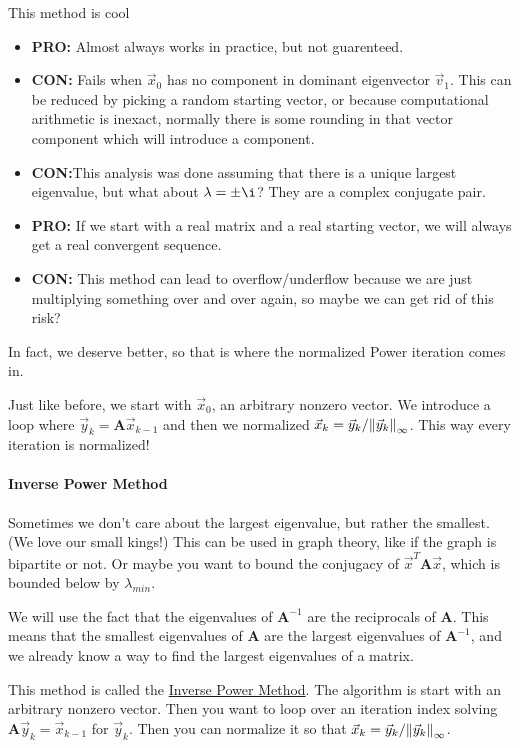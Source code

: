\documentclass[a4paper,12pt]{article} %
\begin{document}
This method is cool 
\begin{itemize}
	\item \textbf{PRO:} Almost always works in practice, but not guarenteed.
	\item \textbf{CON:} Fails when $\vec{x}_0$ has no component in dominant eigenvector $\vec{v}_1$. This can be reduced by picking a random starting vector, or because computational arithmetic is inexact, normally there is some rounding in that vector component which will introduce a component.
	\item \textbf{CON:}This analysis was done assuming that there is a unique largest eigenvalue, but what about $\lambda = \pm \i$? They are a complex conjugate pair.
	\item \textbf{PRO:} If we start with a real matrix and a real starting vector, we will always get a real convergent sequence.
	\item \textbf{CON:} This method can lead to overflow/underflow because we are just multiplying something over and over again, so maybe we can get rid of this risk?
\end{itemize}

In fact, we deserve better, so that is where the normalized Power iteration comes in.

Just like before, we start with $\vec{x}_0$, an arbitrary nonzero vector. We introduce a loop where $\vec{y}_k = \textbf{A}\vec{x}_{k-1}$ and then we normalized $\vec{x}_k = \vec{y}_k / \norm{\vec{y}_k}_{\infty}$. This way every iteration is normalized!


\paragraph{Inverse Power Method} 
Sometimes we don't care about the largest eigenvalue, but rather the smallest. (We love our small kings!) This can be used in graph theory, like if the graph is bipartite or not. Or maybe you want to bound the conjugacy of $\vec{x}^T\textbf{A}\vec{x}$, which is bounded below by $\lambda_{min}$.

We will use the fact that the eigenvalues of $\textbf{A}^{-1}$ are the reciprocals of $\textbf{A}$. This means that the smallest eigenvalues of $\textbf{A}$ are the largest eigenvalues of $\textbf{A}^{-1}$, and we already know a way to find the largest eigenvalues of a matrix. 

This method is called the \underline{Inverse Power Method}. The algorithm is start with an arbitrary nonzero vector. Then you want to loop over an iteration index solving $\textbf{A}\vec{y}_k = \vec{x}_{k-1}$ for $\vec{y}_k$. Then you can normalize it so that $\vec{x}_k = \vec{y}_k / \norm{\vec{y}_k}_{\infty}$. 
\end{document}
